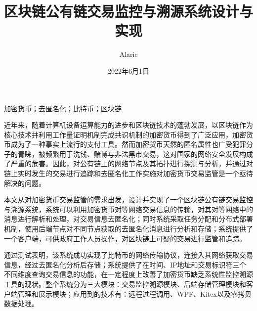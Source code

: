 \documentclass[supercite]{HustGraduPaper}
\title{区块链公有链交易监控与溯源系统设计与实现}
\author{Alaric}
\date{2022年6月1日}
\theoremstyle{definition}
\begin{document}
\maketitle

\statement

\clearpage


\begin{cnabstract}{加密货币；去匿名化；比特币；区块链}

  近年来，随着计算机设备运算能力的进步和区块链技术的蓬勃发展，以区块链作为核心技术并利用工作量证明机制完成共识机制的加密货币得到了广泛应用，加密货币成为了一种事实上流行的支付工具。然而加密货币天然的匿名属性也广受犯罪分子的青睐，被频繁用于洗钱、赌博与非法黑市交易，这对国家的网络安全发展构成了严重的危害。因此，对公有链上的网络节点及其拓扑进行探测与分析，并通过对链上实时发生的交易进行追踪和去匿名化工作实施对加密货币交易监管是一个亟待解决的问题。

  本文从对加密货币交易监管的需求出发，设计并实现了一个区块链公有链交易监控与溯源系统，系统可以利用加密货币对等网络交易信息的传输，对其对等网络中的消息进行解析和处理，对交易信息去匿名化；同时系统采取任务分配和分布式部署机制，使用后端节点对不同节点获取的去匿名化消息进行分析和存储；系统提供了一个客户端，可供政府工作人员操作，对区块链上可疑的交易进行监管和追踪。

  通过测试表明，该系统成功实现了比特币的网络传输协议，连接入其网络获取交易信息，经过去匿名化分析后存储；系统提供了在时间、IP地址和交易标识符三个不同维度查询交易信息的功能，在一定程度上改善了加密货币缺乏系统性监控溯源工具的现状。整个系统分为三大模块：交易监控溯源模块、后端存储管理模块和客户端管理和展示模块；应用到的技术有：远程过程调用、WPF、Kitex以及零拷贝数据处理。


\end{cnabstract}
\end{document}
